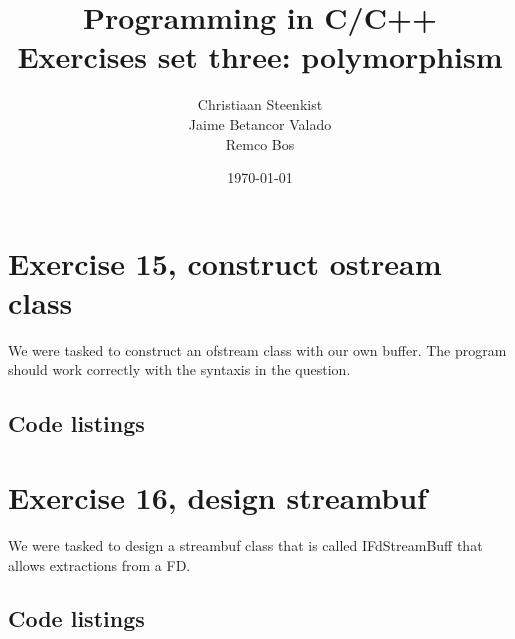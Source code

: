 \documentclass[11pt]{article}
\begin{document}
\title{Programming in C/C++ \\
       Exercises set three: polymorphism
}
\date{\today}
\author{Christiaan Steenkist \\
Jaime Betancor Valado \\
Remco Bos \\
}

\maketitle
\section*{Exercise 15, construct ostream class}
We were tasked to construct an ofstream class with our own buffer. The program should work correctly with the syntaxis in the question.

\subsection*{Code listings}









\section*{Exercise 16, design streambuf}
We were tasked to design a streambuf class that is called IFdStreamBuff that allows extractions from a FD.

\subsection*{Code listings}











\end{document}
